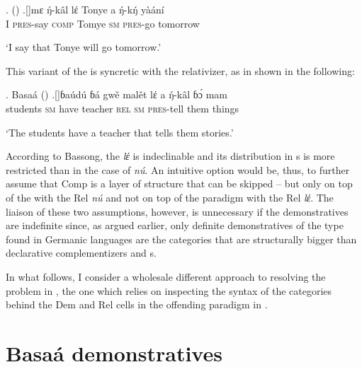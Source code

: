 \ex.  (\citealt[ex. 30a in \S3]{Bassong2010})\label{bassong-ch3}
\ag.[]\hspace{-22pt}mɛ ŋ́-k\^al lέ Tonye a ŋ́-kŋ́ y\`a\'an\'i\\
\hspace{-22pt}I \textsc{pres}-say \textsc{comp} Tomye \textsc{sm} \textsc{pres}-go tomorrow\\
\hspace{-22pt}\strut `I say that Tonye will go tomorrow.'

This variant of the  is syncretic with the relativizer, as in shown in the following:

\ex. Basa\'a (\citealt[ex. 22b in \S4]{Bassong2010})\label{le-rel}
\ag.[]\hspace{-22pt}ɓa\'ud\'u ɓ\'a gw\v{e} mal\v{e}t lέ a ŋ́-k\^al ɓɔ́ mam\\
\hspace{-22pt}students \textsc{sm} have teacher \textsc{rel} \textsc{sm} \textsc{pres-}tell them things\\
\hspace{-22pt}\strut `The students have a teacher that tells them stories.' 

According to Bassong, the  \textit{lέ} is indeclinable and its distribution in s is more restricted than in the case of \textit{n\'u}. An intuitive option would be, thus, to further assume that Comp is a layer of structure that can be skipped -- but only on top of the  with the Rel \textit{n\'u} and not on top of the paradigm with the Rel \textit{lέ}. The liaison of these two assumptions, however, is unnecessary if the  demonstratives are indefinite since, as argued earlier, only definite demonstratives of the type found in Germanic languages are the categories that are structurally bigger than declarative complementizers and s. 
\par
In what follows, I consider a wholesale different approach to resolving the   problem in  , the one which relies on inspecting the syntax of the categories behind the Dem and Rel cells in the offending paradigm in .

\section{Basa\'a demonstratives}

